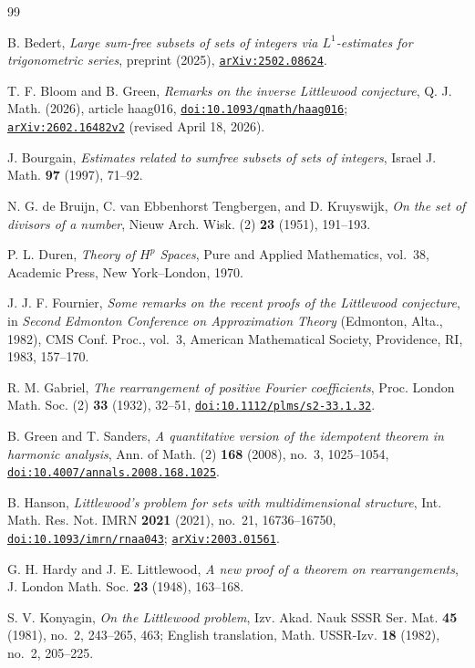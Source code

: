 \documentclass[11pt,reqno]{amsart}
\numberwithin{equation}{section}
\theoremstyle{definition}
\theoremstyle{remark}
\newcommand{\doi}[1]{\href{https://doi.org/#1}{\texttt{doi:#1}}}
\newcommand{\arxiv}[1]{\href{https://arxiv.org/abs/#1}{\texttt{arXiv:#1}}}
\begin{document}
\begin{thebibliography}{99}

B. Bedert, \emph{Large sum-free subsets of sets of integers via
$L^1$-estimates for trigonometric series}, preprint (2025),
\arxiv{2502.08624}.

T. F. Bloom and B. Green, \emph{Remarks on the inverse Littlewood
conjecture}, Q. J. Math. (2026), article haag016,
\doi{10.1093/qmath/haag016}; \arxiv{2602.16482v2}
(revised April 18, 2026).

J. Bourgain, \emph{Estimates related to sumfree subsets of sets of
integers}, Israel J. Math. \textbf{97} (1997), 71--92.

N. G. de Bruijn, C. van Ebbenhorst Tengbergen, and D. Kruyswijk,
\emph{On the set of divisors of a number}, Nieuw Arch. Wisk. (2)
\textbf{23} (1951), 191--193.

P. L. Duren, \emph{Theory of $H^p$ Spaces}, Pure and Applied Mathematics,
vol.~38, Academic Press, New York--London, 1970.

J. J. F. Fournier, \emph{Some remarks on the recent proofs of the
Littlewood conjecture}, in \emph{Second Edmonton Conference on
Approximation Theory} (Edmonton, Alta., 1982), CMS Conf. Proc.,
vol.~3, American Mathematical Society, Providence, RI, 1983,
157--170.

R. M. Gabriel, \emph{The rearrangement of positive Fourier coefficients},
Proc. London Math. Soc. (2) \textbf{33} (1932), 32--51,
\doi{10.1112/plms/s2-33.1.32}.

B. Green and T. Sanders, \emph{A quantitative version of the idempotent
theorem in harmonic analysis}, Ann. of Math. (2) \textbf{168} (2008),
no.~3, 1025--1054, \doi{10.4007/annals.2008.168.1025}.

B. Hanson, \emph{Littlewood's problem for sets with multidimensional
structure}, Int. Math. Res. Not. IMRN \textbf{2021} (2021), no.~21,
16736--16750, \doi{10.1093/imrn/rnaa043}; \arxiv{2003.01561}.

G. H. Hardy and J. E. Littlewood, \emph{A new proof of a theorem on
rearrangements}, J. London Math. Soc. \textbf{23} (1948), 163--168.

S. V. Konyagin, \emph{On the Littlewood problem}, Izv. Akad. Nauk SSSR
Ser. Mat. \textbf{45} (1981), no.~2, 243--265, 463; English translation,
Math. USSR-Izv. \textbf{18} (1982), no.~2, 205--225.


\end{thebibliography}
\end{document}

